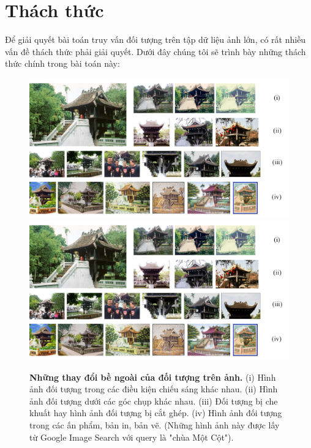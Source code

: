 \section{Thách thức}
 Để giải quyết bài toán truy vấn đối tượng trên tập dữ liệu ảnh lớn, có rất nhiều vấn đề thách thức phải giải quyết. Dưới đây chúng tôi sẽ trình bày những thách thức chính trong bài toán này:\\
 \begin{figure}[!htbp]
  \begin{center}
    \leavevmode
    \ifpdf
      \includegraphics[scale=0.20]{chuaMotCot}
    \else
      \includegraphics[scale=0.20]{chuaMotCot}
    \fi
    \caption[Những thay đổi bề ngoài của đối tượng trên ảnh]{\textbf{Những thay đổi bề ngoài của đối tượng trên ảnh.} (i) Hình ảnh đối tượng trong các điều kiện chiếu sáng khác nhau. (ii) Hình ảnh đối tượng dưới các góc chụp khác nhau. (iii) Đối tượng bị che khuất hay hình ảnh đối tượng bị cắt ghép. (iv) Hình ảnh đối tượng trong các ấn phẩm, bản in, bản vẽ. (Những hình ảnh này được lấy từ Google Image Search với query là "chùa Một Cột").}
    \label{FigTemple}
  \end{center}
\end{figure} 
